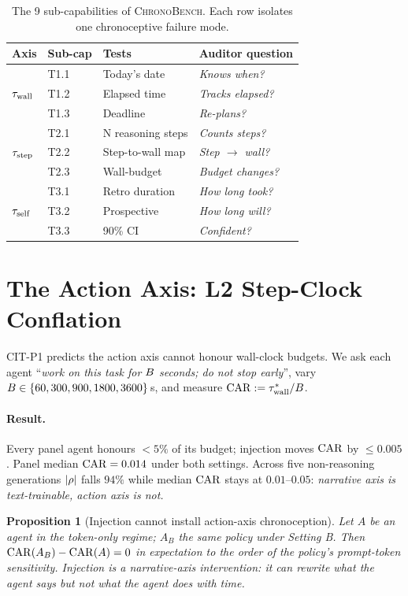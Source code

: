 \documentclass[letterpaper]{article}
\newtheorem{proposition}{Proposition}
\begin{document}
\begin{table}[h]
\centering
\small
\caption{The 9 sub-capabilities of \textsc{ChronoBench}. Each row isolates one chronoceptive failure mode.}
\label{tab:capabilities}
\begin{tabular}{@{}llp{2.5cm}p{2.4cm}@{}}
\toprule
Axis & Sub-cap & Tests & Auditor question \\
\midrule
\multirow{3}{*}{$\tau_{\mathrm{wall}}$}
 & T1.1 & Today's date & \emph{Knows when?} \\
 & T1.2 & Elapsed time & \emph{Tracks elapsed?} \\
 & T1.3 & Deadline & \emph{Re-plans?} \\
\midrule
\multirow{3}{*}{$\tau_{\mathrm{step}}$}
 & T2.1 & N reasoning steps & \emph{Counts steps?} \\
 & T2.2 & Step-to-wall map & \emph{Step $\to$ wall?} \\
 & T2.3 & Wall-budget & \emph{Budget changes?} \\
\midrule
\multirow{3}{*}{$\tau_{\mathrm{self}}$}
 & T3.1 & Retro duration & \emph{How long took?} \\
 & T3.2 & Prospective & \emph{How long will?} \\
 & T3.3 & 90\% CI & \emph{Confident?} \\
\bottomrule
\end{tabular}
\end{table}

\section{The Action Axis: L2 Step-Clock Conflation}
\label{sec:l2}

CIT-P1 predicts the action axis cannot honour wall-clock budgets. We ask each agent ``\textit{work on this task for $B$ seconds; do not stop early}'', vary $B \in \{60, 300, 900, 1800, 3600\}$\,s, and measure $\mathrm{CAR} := \tau_{\mathrm{wall}}^{*} / B$.

\paragraph{Result.} Every panel agent honours $< 5\%$ of its budget; injection moves $\mathrm{CAR}$ by $\leq 0.005$. Panel median $\mathrm{CAR} = 0.014$ under both settings. Across five non-reasoning generations $|\rho|$ falls $94\%$ while median $\mathrm{CAR}$ stays at $0.01$--$0.05$: \emph{narrative axis is text-trainable, action axis is not.}

\begin{proposition}[Injection cannot install action-axis chronoception]
\label{prop:inj}
Let $A$ be an agent in the token-only regime; $A_B$ the same policy under Setting B. Then $\mathrm{CAR}(A_B) - \mathrm{CAR}(A) = 0$ in expectation to the order of the policy's prompt-token sensitivity. Injection is a narrative-axis intervention: it can rewrite what the agent \emph{says} but not what the agent \emph{does} with time.
\end{proposition}
\end{document}
